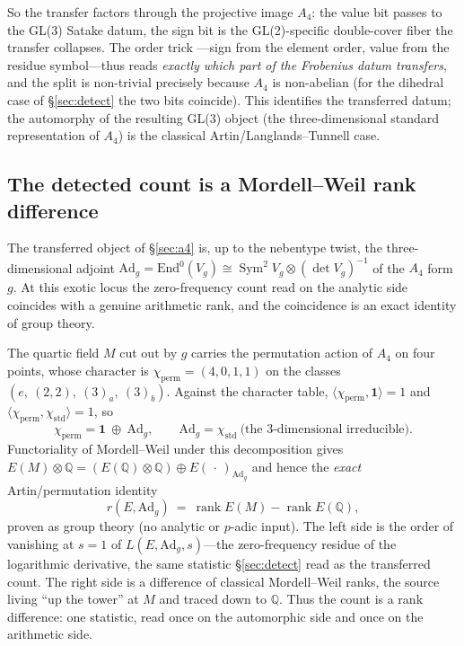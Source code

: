 \documentclass[11pt]{article}
\theoremstyle{definition}
\newcommand{\Sym}{\operatorname{Sym}}
\begin{document}
So the transfer factors through the projective image $A_4$: the value bit passes to the GL(3) Satake
datum, the sign bit is the GL(2)-specific double-cover fiber the transfer collapses. The order trick
---sign from the element order, value from the residue symbol---thus reads \emph{exactly which part
of the Frobenius datum transfers}, and the split is non-trivial precisely because $A_4$ is
non-abelian (for the dihedral case of \S\ref{sec:detect} the two bits coincide). This identifies the
transferred datum; the automorphy of the resulting GL(3) object (the three-dimensional standard
representation of $A_4$) is the classical Artin/Langlands--Tunnell case.

\subsection{The detected count is a Mordell--Weil rank difference}\label{sec:rankdiff}

The transferred object of \S\ref{sec:a4} is, up to the nebentype twist, the three-dimensional
adjoint $\mathrm{Ad}_g=\mathrm{End}^0(V_g)\cong\Sym^2 V_g\otimes(\det V_g)^{-1}$ of the $A_4$ form
$g$. At this exotic locus the zero-frequency count read on the analytic side coincides with a
genuine arithmetic rank, and the coincidence is an exact identity of group theory.

The quartic field $M$ cut out by $g$ carries the permutation action of $A_4$ on four points, whose
character is $\chi_{\mathrm{perm}}=(4,0,1,1)$ on the classes $(e,\ (2,2),\ (3)_a,\ (3)_b)$. Against the
character table, $\langle\chi_{\mathrm{perm}},\mathbf 1\rangle=1$ and
$\langle\chi_{\mathrm{perm}},\chi_{\mathrm{std}}\rangle=1$, so
\[
  \chi_{\mathrm{perm}}=\mathbf 1\ \oplus\ \mathrm{Ad}_g,\qquad \mathrm{Ad}_g=\chi_{\mathrm{std}}\
  \text{(the $3$-dimensional irreducible)} .
\]
Functoriality of Mordell--Weil under this decomposition gives
$E(M)\otimes\mathbb Q = (E(\mathbb Q)\otimes\mathbb Q)\oplus E(\,\cdot\,)_{\mathrm{Ad}_g}$ and hence the
\emph{exact} Artin/permutation identity
\begin{equation}\label{eq:rankdiff}
  r(E,\mathrm{Ad}_g)\ =\ \operatorname{rank}E(M)-\operatorname{rank}E(\mathbb Q),
\end{equation}
proven as group theory (no analytic or $p$-adic input). The left side is the order of vanishing at
$s=1$ of $L(E,\mathrm{Ad}_g,s)$---the zero-frequency residue of the logarithmic derivative, the same
statistic \S\ref{sec:detect} read as the transferred count. The right side is a difference of
classical Mordell--Weil ranks, the source living ``up the tower'' at $M$ and traced down to
$\mathbb Q$. Thus the count is a rank difference: one statistic, read once on the automorphic side
and once on the arithmetic side.
\end{document}
